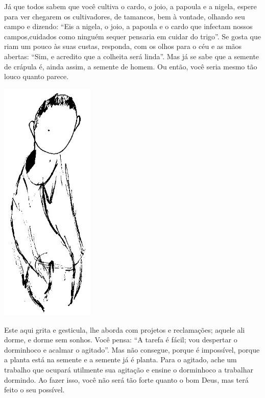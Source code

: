 \bigskip
\bigskip

Já que todos sabem que você cultiva o cardo, o joio, a papoula e a
nigela, espere para ver chegarem os cultivadores, de tamancos, bem à
vontade, olhando seu campo e dizendo: ``Eis a nigela, o joio, a papoula
e o cardo que infectam nossos campos,cuidados como ninguém sequer
pensaria em cuidar do trigo''. Se gosta que riam um pouco às suas
custas, responda, com os olhos para o céu e as mãos abertas: ``Sim, e
acredito que a colheita será linda''. Mas já se sabe que a semente de
crápula é, ainda assim, a semente de homem. Ou então, você seria mesmo
tão louco quanto parece.

\bigskip
\bigskip

\pagebreak
\thispagestyle{empty}

\begin{vplace}[1]
\begin{center}
\includegraphics[width=45mm]{./imgs/Image_2.jpg}
\end{center}
\end{vplace}

\pagebreak

Este aqui grita e gesticula, lhe aborda com projetos e reclamações;
aquele ali dorme, e dorme sem sonhos. Você pensa: ``A tarefa é fácil;
vou despertar o dorminhoco e acalmar o agitado''. Mas não consegue,
porque é impossível, porque a planta está na semente e a semente já é
planta. Para o agitado, ache um trabalho que ocupará utilmente sua
agitação e ensine o dorminhoco a trabalhar dormindo. Ao fazer isso, você
não será tão forte quanto o bom Deus, mas terá feito o seu possível.


